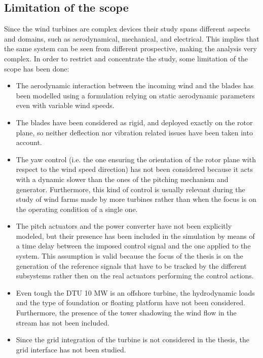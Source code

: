 \subsection{Limitation of the scope}\label{subsec:limitation_of_scope}
Since the wind turbines are complex devices their study spans different aspects and domains, such as aerodynamical, mechanical, and electrical. This implies that the same system can be seen from different prospective, making the analysis very complex. In order to restrict and concentrate the study, some limitation of the scope has been done:
\begin{itemize}
  \item The aerodynamic interaction between the incoming wind and the blades has been modelled using a formulation relying on static aerodynamic parameters even with variable wind speeds.
  \item The blades have been considered as rigid, and deployed exactly on the rotor plane, so neither deflection nor vibration related issues have been taken into account.
  \item The yaw control (i.e. the one ensuring the orientation of the rotor plane with respect to the wind speed direction) has not been considered because it acts with a dynamic slower than the ones of the pitching mechanism and generator. Furthermore, this kind of control is usually relevant during the study of wind farms made by more turbines rather than when the focus is on the operating condition of a single one. 
  \item The pitch actuators and the power converter have not been explicitly modeled, but their presence has been included in the simulation by means of a time delay between the imposed control signal and the one applied to the system. This assumption is valid because the focus of the thesis is on the generation of the reference signals that have to be tracked by the different subsystems rather then on the real actuators performing the control actions.
  \item Even tough the DTU 10 MW is an offshore turbine, the hydrodynamic loads and  the type of foundation or floating platform have not been considered. Furthermore, the presence of the tower shadowing the wind flow in the stream has not been included.
  \item Since the grid integration of the turbine is not considered in the thesis, the grid interface has not been studied.    
\end{itemize}